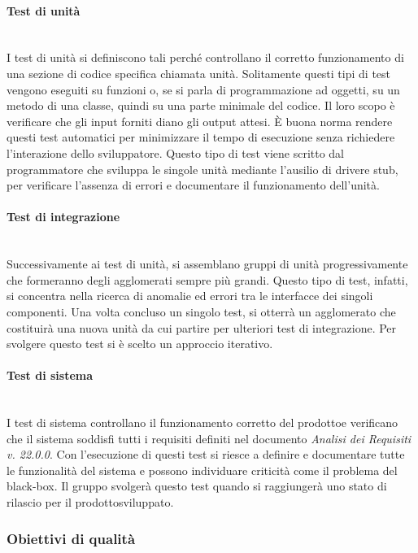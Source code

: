 \paragraph*{Test di unità} \mbox{}\\ [1mm]
I test di unità si definiscono tali perché controllano il corretto funzionamento di una sezione di codice specifica chiamata unità. Solitamente questi tipi di test vengono eseguiti su funzioni o, se si parla di programmazione ad oggetti, su un metodo di una classe, quindi su una parte minimale del codice. Il loro scopo è verificare che gli input forniti diano gli output attesi. È buona norma rendere questi test automatici per minimizzare il tempo di esecuzione senza richiedere l'interazione dello sviluppatore. Questo tipo di test viene scritto dal programmatore che sviluppa le singole unità mediante l'ausilio di driver\glosp e stub\glo, per verificare l'assenza di errori e documentare il funzionamento dell'unità.

\paragraph*{Test di integrazione} \mbox{}\\ [1mm]
Successivamente ai test di unità, si assemblano gruppi di unità progressivamente che formeranno degli agglomerati sempre più grandi. Questo tipo di test, infatti, si concentra nella ricerca di anomalie ed errori tra le interfacce dei singoli componenti. Una volta concluso un singolo test, si otterrà un agglomerato che costituirà una nuova unità da cui partire per ulteriori test di integrazione. Per svolgere questo test si è scelto un approccio iterativo.

\paragraph*{Test di sistema} \mbox{}\\ [1mm]
I test di sistema controllano il funzionamento corretto del prodotto\glosp e verificano che il sistema soddisfi tutti i requisiti definiti nel documento \textit{Analisi dei Requisiti v. 22.0.0}. Con l'esecuzione di questi test si riesce a definire e documentare tutte le funzionalità del sistema e possono individuare criticità come il problema del black-box\glo. Il gruppo svolgerà questo test quando si raggiungerà uno stato di rilascio per il prodotto\glosp sviluppato.

\subsubsection{Obiettivi di qualità}
